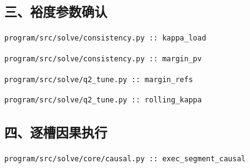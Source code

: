 \subsection*{三、裕度参数确认}
\noindent\texttt{program/src/solve/consistency.py :: kappa\_load}\par

\noindent\texttt{program/src/solve/consistency.py :: margin\_pv}\par

\noindent\texttt{program/src/solve/q2\_tune.py :: margin\_refs}\par

\noindent\texttt{program/src/solve/q2\_tune.py :: rolling\_kappa}\par

\subsection*{四、逐槽因果执行}
\noindent\texttt{program/src/solve/core/causal.py :: exec\_segment\_causal}\par

